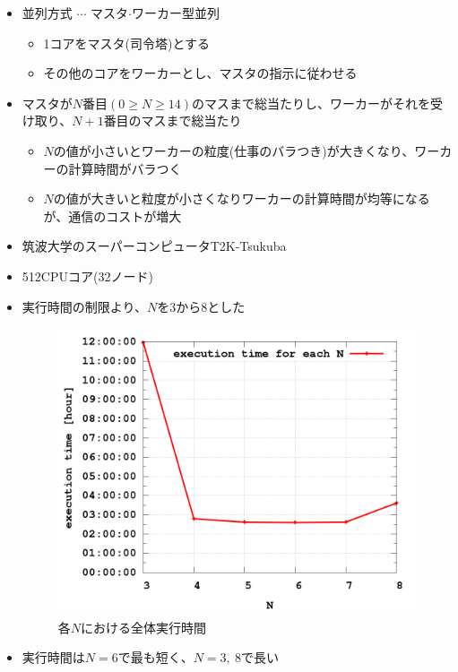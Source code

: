 \documentclass[a4paper,landscape,25pt]{foils}
\begin{document}
\begin{itemize}
\item 並列方式 $\cdots$ マスタ$\cdot$ワーカー型並列
\begin{itemize}
\item 1コアをマスタ(司令塔)とする
\item その他のコアをワーカーとし、マスタの指示に従わせる
\end{itemize}
\end{itemize}

\begin{itemize}
\item マスタが$N$番目$(0 \ge N \ge 14)$のマスまで総当たりし、ワーカーがそれを受け取り、$N+1$番目のマスまで総当たり
\begin{itemize}
\item $N$の値が小さいとワーカーの粒度(仕事のバラつき)が大きくなり、ワーカーの計算時間がバラつく
\item $N$の値が大きいと粒度が小さくなりワーカーの計算時間が均等になるが、通信のコストが増大
\end{itemize}
\end{itemize}

\begin{itemize}
\item 筑波大学のスーパーコンピュータT2K-Tsukuba
\item 512CPUコア(32ノード)
\end{itemize}

\begin{itemize}
\item 実行時間の制限より、$N$を3から8とした
\newpage
\begin{figure}[htb]
\centering
\includegraphics[height=0.7\textheight]{image3}
\caption{各$N$における全体実行時間}
\end{figure}
\item 実行時間は$N=6$で最も短く、$N=3, \ 8$で長い
\end{itemize}
\end{document}
